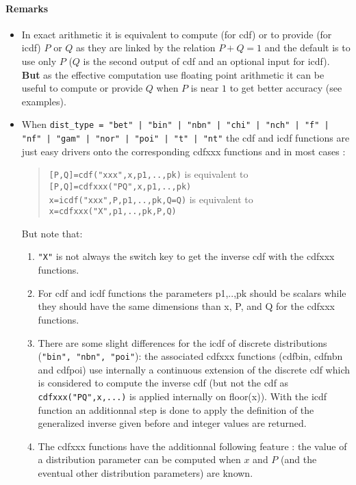 \begin{mandescription}
\paragraph{Remarks}
\begin{itemize}
\item In exact arithmetic it is equivalent to compute (for cdf) or to provide (for icdf) $P$ or $Q$ as they are
      linked by the relation $P+Q=1$ and the default is to use only $P$ ($Q$ is the second output of cdf and
      an optional input for icdf). {\bf But} as the effective computation use floating point arithmetic it 
      can be useful to compute or provide $Q$ when $P$ is near $1$ to get better accuracy (see examples).
\item When \verb+dist_type = "bet" | "bin" | "nbn" | "chi" | "nch" | "f" | "nf" | "gam" | "nor" | "poi" | "t" | "nt"+ 
      the cdf and icdf functions are just easy drivers onto the corresponding cdfxxx functions and in
      most cases :
      \begin{quote}
         \verb+[P,Q]=cdf("xxx",x,p1,..,pk)+ is equivalent to \verb+[P,Q]=cdfxxx("PQ",x,p1,..,pk)+\\
         \verb+x=icdf("xxx",P,p1,..,pk,Q=Q)+ is equivalent to \verb+x=cdfxxx("X",p1,..,pk,P,Q)+
      \end{quote}
      But note that:
      \begin{enumerate}
      \item \verb+"X"+ is not always the switch key to get the inverse cdf with the cdfxxx functions.
      \item For cdf and icdf functions the parameters p1,..,pk should be scalars while they should have
            the same dimensions than x, P, and Q for the cdfxxx functions.
      \item There are some slight differences for the icdf of discrete distributions (\verb+"bin", "nbn", "poi"+): 
            the associated cdfxxx functions (cdfbin, cdfnbn and cdfpoi) use internally a continuous extension of 
            the discrete cdf which is considered to compute the inverse cdf (but not the cdf as 
            \verb+cdfxxx("PQ",x,...)+ is applied internally on floor(x)). With the icdf function an additionnal 
            step is done to apply the definition of the generalized inverse given before and integer values are returned.
      \item The cdfxxx functions have the additionnal following feature : the value of a distribution parameter 
            can be computed when $x$ and $P$ (and the eventual  other distribution parameters) are known.
      \end{enumerate}
\end{itemize}


\end{mandescription}
